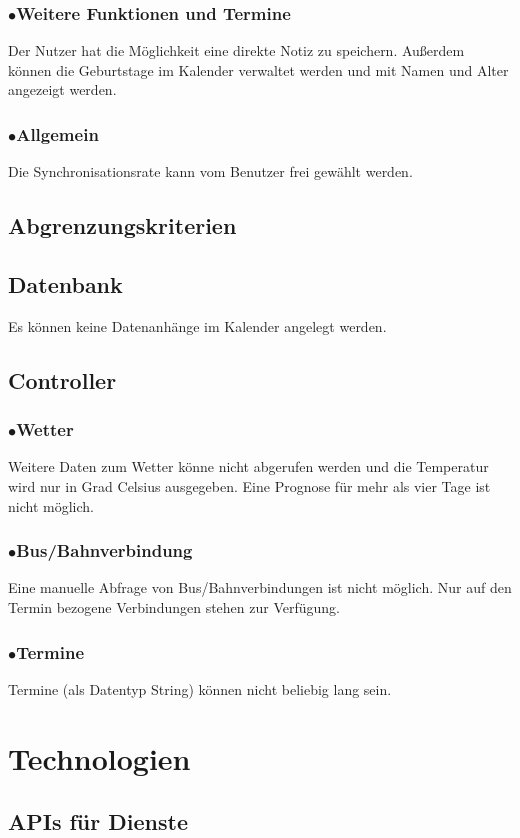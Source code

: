 \documentclass[12pt]{article}
\begin{document}
\subsubsection*{$\bullet$\quad Weitere Funktionen und Termine}
Der Nutzer hat die Möglichkeit eine direkte Notiz zu speichern. Außerdem können die Geburtstage im Kalender verwaltet werden und mit Namen und Alter angezeigt werden.
\subsubsection*{$\bullet$\quad Allgemein}
Die Synchronisationsrate kann vom Benutzer frei gewählt werden.
\subsection{Abgrenzungskriterien}
\subsection*{Datenbank}
Es können keine Datenanhänge im Kalender angelegt werden.
\subsection*{Controller}
\subsubsection*{$\bullet$\quad Wetter}
Weitere Daten zum Wetter könne nicht abgerufen werden und die Temperatur wird nur in Grad Celsius ausgegeben. Eine Prognose für mehr als vier Tage ist nicht möglich.
\subsubsection*{$\bullet$\quad Bus/Bahnverbindung}
Eine manuelle Abfrage von Bus/Bahnverbindungen ist nicht möglich. Nur auf den Termin bezogene Verbindungen stehen zur Verfügung.
\subsubsection*{$\bullet$\quad Termine}
Termine (als Datentyp String) können nicht beliebig lang sein.

\section{Technologien}
\subsection*{APIs für Dienste}
\begin{itemize}
\item{Für Wetter(prognose): DarkSky\\ \url{https://darksky.net/dev}}
\item{Für Bahnverbindungen: Google Directions API} \\ \url{https://developers.google.com/api-client-library/java}}
\end{itemize}
\end{document}
